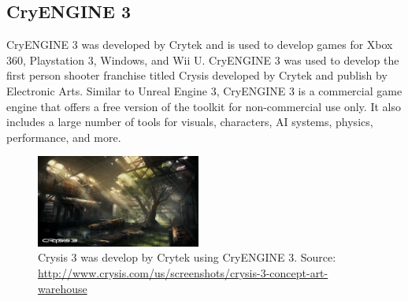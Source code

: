 \subsection{CryENGINE 3}
CryENGINE 3 was developed by Crytek and is used to develop games for Xbox 360, Playstation 3, Windows, and Wii U. CryENGINE 3 was used to develop the first person shooter franchise titled Crysis developed by Crytek and publish by Electronic Arts. Similar to Unreal Engine 3, CryENGINE 3 is a commercial game engine that offers a free version of the toolkit for non-commercial use only. It also includes a large number of tools for visuals, characters, AI systems, physics, performance, and more.
\begin{figure}[!ht]
  \centering \includegraphics[width=0.48\textwidth]{Images/Crysis3_Fields_Warehouse_ConceptArt.png}
	\caption{Crysis 3 was develop by Crytek using CryENGINE 3. Source: \url{http://www.crysis.com/us/screenshots/crysis-3-concept-art-warehouse}}
\end{figure}


